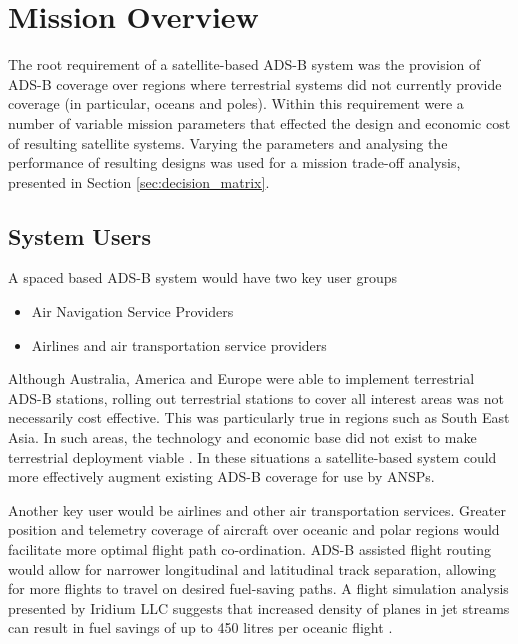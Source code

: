 \section{Mission Overview}
The root requirement of a satellite-based ADS-B system was the provision of ADS-B coverage over regions where terrestrial systems did not currently provide coverage (in particular, oceans and poles). Within this requirement were a number of variable mission parameters that effected the design and economic cost of resulting satellite systems. Varying the parameters and analysing the performance of resulting designs was used for a mission trade-off analysis, presented in Section \ref{sec:decision_matrix}.

\subsection{System Users}
A spaced based ADS-B system would have two key user groups
\begin{itemize}
	\item Air Navigation Service Providers
	\item Airlines and air transportation service providers
\end{itemize}
Although Australia, America and Europe were able to implement terrestrial ADS-B stations, rolling out terrestrial stations to cover all interest areas was not necessarily cost effective. This was particularly true in regions such as South East Asia. In such areas, the technology and economic base did not exist to make terrestrial deployment viable \cite{Blomenhofer2012}. In these situations a satellite-based system could more effectively augment existing ADS-B coverage for use by ANSPs.

Another key user would be airlines and other air transportation services. Greater position and telemetry coverage of aircraft over oceanic and polar regions would facilitate more optimal flight path co-ordination. ADS-B assisted flight routing would allow for narrower longitudinal and latitudinal track separation, allowing for more flights to travel on desired fuel-saving paths. A flight simulation analysis presented by Iridium LLC suggests that increased density of planes in jet streams can result in fuel savings of up to 450 litres per oceanic flight \cite{Dawson2013}. 



